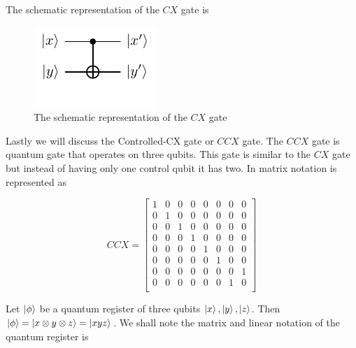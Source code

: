The schematic representation of the $CX$ gate is
\begin{figure}[ht]
    \centering
    \includegraphics{images/3_Quantum_Computing/cx_gate.pdf}
    \caption{The schematic representation of the $CX$ gate}
\end{figure}

Lastly we will discuss the Controlled-CX gate or $CCX$ gate. The $CCX$ gate is quantum
gate that operates on three qubits. This gate is similar to the $CX$ gate but instead
of having only one control qubit it has two. In matrix notation is represented as

\begin{equation}
    CCX=\begin{bmatrix}
        1 & 0 & 0 & 0 & 0 & 0 & 0 & 0 \\
        0 & 1 & 0 & 0 & 0 & 0 & 0 & 0 \\
        0 & 0 & 1 & 0 & 0 & 0 & 0 & 0 \\
        0 & 0 & 0 & 1 & 0 & 0 & 0 & 0 \\
        0 & 0 & 0 & 0 & 1 & 0 & 0 & 0 \\
        0 & 0 & 0 & 0 & 0 & 1 & 0 & 0 \\
        0 & 0 & 0 & 0 & 0 & 0 & 0 & 1 \\
        0 & 0 & 0 & 0 & 0 & 0 & 1 & 0 \\
    \end{bmatrix}
\end{equation}

Let $\ket{\phi}$ be a quantum register of three qubits $\ket{x},\ket{y},\ket{z}$. Then
$\ket{\phi}=\ket{x\otimes y\otimes z}=\ket{xyz}$. We shall note the matrix and linear notation
of the quantum register is

